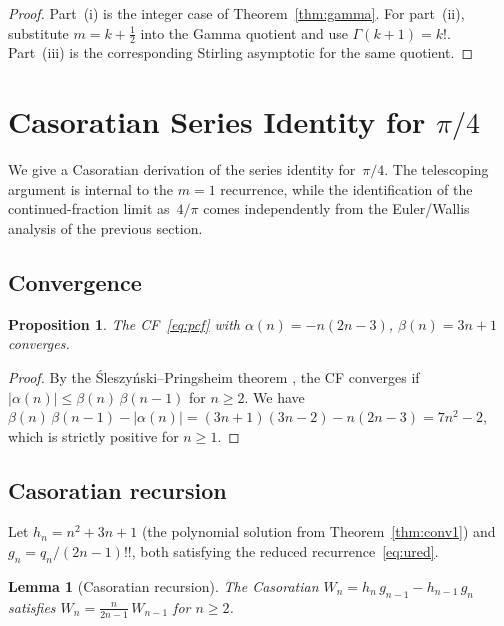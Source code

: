 \documentclass[11pt,a4paper]{article}
\theoremstyle{plain}
\newtheorem{lemma}[theorem]{Lemma}
\newtheorem{proposition}[theorem]{Proposition}
\theoremstyle{definition}
\theoremstyle{remark}
\newcommand{\half}{\tfrac{1}{2}}
\newcommand{\dff}[1]{(#1)!!}
\begin{document}
\begin{proof}
Part~\textup{(i)} is the integer case of Theorem~\ref{thm:gamma}.
For part~\textup{(ii)}, substitute $m=k{+}\half$ into the Gamma quotient and
use $\Gamma(k{+}1)=k!$. Part~\textup{(iii)} is the corresponding Stirling
asymptotic for the same quotient.
\end{proof}

\section{Casoratian Series Identity for \texorpdfstring{$\pi/4$}{pi/4}}%
\label{sec:casoratian}

We give a Casoratian derivation of the series identity for~$\pi/4$.
The telescoping argument is internal to the $m=1$ recurrence, while
the identification of the continued-fraction limit as~$4/\pi$ comes
independently from the Euler/Wallis analysis of the previous section.

\subsection{Convergence}

\begin{proposition}\label{prop:conv}
The CF~\eqref{eq:pcf} with
$\alpha(n) = -n(2n{-}3)$, $\beta(n) = 3n{+}1$ converges.
\end{proposition}

\begin{proof}
By the \'Sleszy\'nski--Pringsheim theorem
\citep[Theorem~4.35]{lorentzen2008},
the CF converges if
$|\alpha(n)| \leq \beta(n)\,\beta(n{-}1)$ for $n \geq 2$.
We have
$\beta(n)\,\beta(n{-}1) - |\alpha(n)|
= (3n{+}1)(3n{-}2) - n(2n{-}3) = 7n^2 - 2$,
which is strictly positive for $n \geq 1$.
\end{proof}

\subsection{Casoratian recursion}

Let $h_n = n^2{+}3n{+}1$ (the polynomial solution from
Theorem~\ref{thm:conv1}) and $g_n = q_n/\dff{2n{-}1}$,
both satisfying the reduced recurrence~\eqref{eq:ured}.

\begin{lemma}[Casoratian recursion]\label{lem:cas_rec}
The Casoratian $W_n = h_n\,g_{n-1} - h_{n-1}\,g_n$ satisfies
$W_n = \frac{n}{2n{-}1}\,W_{n-1}$ for $n \geq 2$.
\end{lemma}
\end{document}
